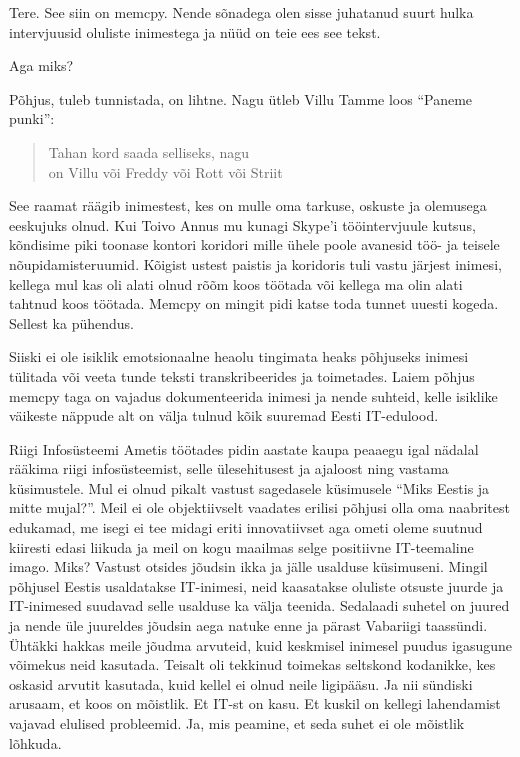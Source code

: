Tere. See siin on memcpy. Nende sõnadega olen sisse juhatanud suurt hulka 
intervjuusid oluliste inimestega ja nüüd on teie ees see tekst. 

Aga miks? 

Põhjus, tuleb tunnistada, on lihtne. Nagu ütleb Villu Tamme loos 
\enquote{Paneme punki}:

\begin{verse}
Tahan kord saada selliseks, nagu \\
on Villu või Freddy või Rott või Striit\\
\end{verse}

See raamat räägib inimestest, kes on mulle oma tarkuse, oskuste ja olemusega 
eeskujuks olnud. Kui Toivo Annus mu kunagi Skype'i 
tööintervjuule kutsus, kõndisime piki toonase kontori koridori mille ühele 
poole avanesid töö- ja teisele nõupidamisteruumid. Kõigist ustest paistis ja 
koridoris tuli vastu järjest inimesi, kellega mul kas oli alati olnud rõõm koos 
töötada või kellega ma olin alati tahtnud koos töötada. Memcpy on mingit pidi 
katse toda tunnet uuesti kogeda. Sellest ka pühendus.

Siiski ei ole isiklik emotsionaalne heaolu tingimata heaks põhjuseks inimesi 
tülitada või veeta tunde teksti transkribeerides ja toimetades. Laiem põhjus 
memcpy taga on vajadus dokumenteerida inimesi ja nende suhteid, kelle isiklike 
väikeste näppude alt on välja tulnud kõik suuremad Eesti IT-edulood. 

Riigi Infosüsteemi Ametis töötades pidin aastate 
kaupa peaaegu igal nädalal rääkima riigi infosüsteemist, selle ülesehitusest ja 
ajaloost ning vastama küsimustele. Mul ei olnud pikalt vastust sagedasele 
küsimusele \enquote{Miks Eestis ja mitte mujal?}. Meil ei ole objektiivselt 
vaadates erilisi põhjusi olla oma naabritest edukamad, me isegi ei tee midagi 
eriti innovatiivset aga ometi oleme suutnud kiiresti edasi liikuda ja meil on 
kogu maailmas selge positiivne IT-teemaline imago. Miks? Vastust otsides 
jõudsin ikka ja jälle usalduse küsimuseni. Mingil põhjusel Eestis usaldatakse 
IT-inimesi, neid kaasatakse oluliste otsuste juurde ja IT-inimesed suudavad 
selle usalduse ka välja teenida. Sedalaadi suhetel on juured ja nende üle 
juureldes jõudsin aega natuke enne ja pärast Vabariigi taassündi. Ühtäkki 
hakkas meile jõudma arvuteid, kuid keskmisel inimesel puudus igasugune võimekus 
neid kasutada. Teisalt oli tekkinud toimekas seltskond kodanikke, kes oskasid 
arvutit kasutada, kuid kellel ei olnud neile ligipääsu. Ja nii sündiski 
arusaam, et koos on mõistlik. Et IT-st on kasu. Et kuskil on kellegi 
lahendamist vajavad elulised probleemid. Ja, mis peamine, et seda suhet ei ole 
mõistlik lõhkuda. 

